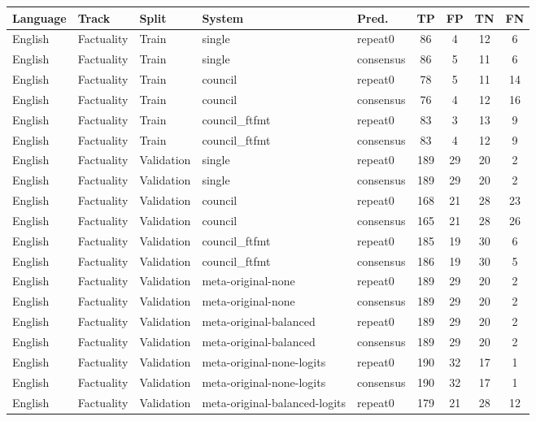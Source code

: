 \begin{tabular}{lllllcccc}
\hline
\textbf{Language} & \textbf{Track} & \textbf{Split} & \textbf{System} & \textbf{Pred.} & \textbf{TP} & \textbf{FP} & \textbf{TN} & \textbf{FN} \\
\hline
English & Factuality & Train & single & repeat0 & 86 & 4 & 12 & 6 \\
English & Factuality & Train & single & consensus & 86 & 5 & 11 & 6 \\
English & Factuality & Train & council & repeat0 & 78 & 5 & 11 & 14 \\
English & Factuality & Train & council & consensus & 76 & 4 & 12 & 16 \\
English & Factuality & Train & council\_ftfmt & repeat0 & 83 & 3 & 13 & 9 \\
English & Factuality & Train & council\_ftfmt & consensus & 83 & 4 & 12 & 9 \\
English & Factuality & Validation & single & repeat0 & 189 & 29 & 20 & 2 \\
English & Factuality & Validation & single & consensus & 189 & 29 & 20 & 2 \\
English & Factuality & Validation & council & repeat0 & 168 & 21 & 28 & 23 \\
English & Factuality & Validation & council & consensus & 165 & 21 & 28 & 26 \\
English & Factuality & Validation & council\_ftfmt & repeat0 & 185 & 19 & 30 & 6 \\
English & Factuality & Validation & council\_ftfmt & consensus & 186 & 19 & 30 & 5 \\
English & Factuality & Validation & meta-original-none & repeat0 & 189 & 29 & 20 & 2 \\
English & Factuality & Validation & meta-original-none & consensus & 189 & 29 & 20 & 2 \\
English & Factuality & Validation & meta-original-balanced & repeat0 & 189 & 29 & 20 & 2 \\
English & Factuality & Validation & meta-original-balanced & consensus & 189 & 29 & 20 & 2 \\
English & Factuality & Validation & meta-original-none-logits & repeat0 & 190 & 32 & 17 & 1 \\
English & Factuality & Validation & meta-original-none-logits & consensus & 190 & 32 & 17 & 1 \\
English & Factuality & Validation & meta-original-balanced-logits & repeat0 & 179 & 21 & 28 & 12 \\

\end{tabular}
